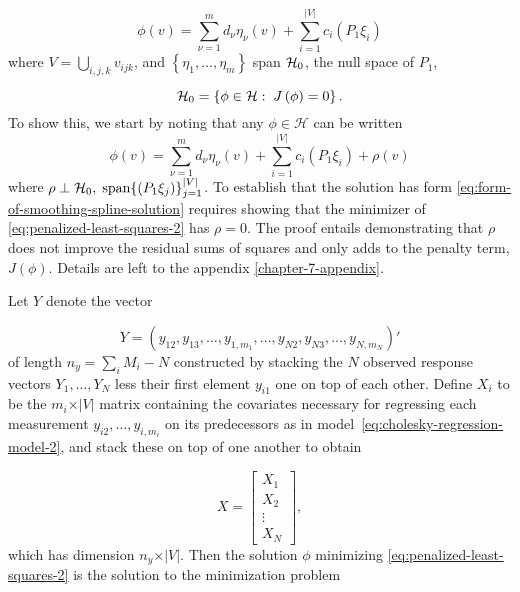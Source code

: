 \begin{equation} \label{eq:form-of-smoothing-spline-solution}
\phi\left( v \right) = \sum_{\nu=1}^{m} d_\nu \eta_\nu \left( v \right) + \sum_{i = 1}^{\vert V \vert} c_{i}\left(P_1 \xi_i \right)
\end{equation}
\noindent
where $V = \bigcup\limits_{i,j,k} v_{ijk}$, and $\left\{\eta_1,\dots, \eta_{m}\right\}$ span $\mathcal{H}_0$, the null space of $P_1$,

\begin{equation*}
\mathcal{H}_0 = \left\{ \phi \in \mathcal{H}:\;J\left( \phi \right) = 0 \right\}.
\end{equation*}
\noindent
To show this, we start by noting that any $\phi \in \mathcal{H}$ can be written 
\begin{equation} \label{eq:smoothing-spline-representer-expansion-1}
\phi\left( v \right) = \sum_{\nu=1}^{m} d_\nu \eta_\nu \left( v \right) + \sum_{i = 1}^{\vert V \vert} c_{i}\left(P_1 \xi_i \right) + \rho\left(v\right)
\end{equation}
\noindent
where $\rho \perp \mathcal{H}_0,\; \textup{span}\lbrace \left(P_1 \xi_{j} \right) \rbrace_{j = 1}^{\vert V\vert}$. To establish that the solution has form \ref{eq:form-of-smoothing-spline-solution} requires showing that the minimizer of \ref{eq:penalized-least-squares-2} has $\rho = 0$. The proof entails demonstrating that $\rho$ does not improve the residual sums of squares and only adds to the penalty term, $J\left(\phi\right)$. Details are left to the appendix \ref{chapter-7-appendix}.

\bigskip
\noindent
Let $Y$ denote the vector 

\[
Y = \left( y_{12}, y_{13},\dots, y_{1,m_1}, \dots, y_{N2}, y_{N3},\dots, y_{N,m_N} \right)'
\]
\noindent
of length $n_y= \sum_{i} M_i - N$  constructed by stacking the $N$ observed response vectors $Y_1,\dots, Y_N$ less their first element $y_{i1}$ one on top of each other. Define $X_i$ to be the $m_i \times \vert V \vert$ matrix containing the covariates necessary for regressing each measurement $y_{i2}, \dots, y_{i,m_i}$ on its predecessors as in model~\ref{eq:cholesky-regression-model-2}, and stack these on top of one another to obtain

\begin{equation} \label{eq:ar-design-matrix-1}
X = \begin{bmatrix}
X_1 \\
X_2\\
\vdots \\
X_N
\end{bmatrix},
\end{equation}
\noindent
which has dimension $n_y \times \vert V \vert$. Then the solution $\phi$  minimizing \ref{eq:penalized-least-squares-2}  is the solution to the minimization problem


